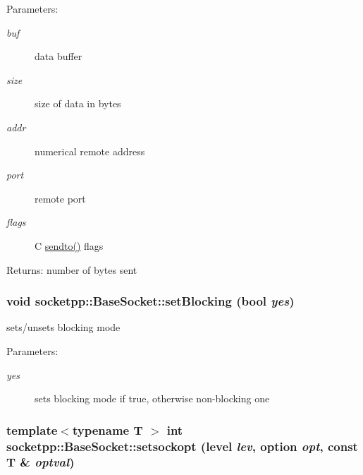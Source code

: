 \begin{CompactItemize}
\begin{Desc}
\item[Parameters:]
\begin{description}
\item[{\em buf}]data buffer \item[{\em size}]size of data in bytes \item[{\em addr}]numerical remote address \item[{\em port}]remote port \item[{\em flags}]C \hyperlink{classsocketpp_1_1BaseSocket_d6df36281c6fce81e5c4c493ac91a6f8}{sendto()} flags \end{description}
\end{Desc}
\begin{Desc}
\item[Returns:]number of bytes sent \end{Desc}
\hypertarget{classsocketpp_1_1BaseSocket_4cffcd5cae4ef51e953495837fade4c3}{
\subsubsection[{setBlocking}]{\setlength{\rightskip}{0pt plus 5cm}void socketpp::BaseSocket::setBlocking (bool {\em yes})}}
\label{classsocketpp_1_1BaseSocket_4cffcd5cae4ef51e953495837fade4c3}


sets/unsets blocking mode 

\begin{Desc}
\item[Parameters:]
\begin{description}
\item[{\em yes}]sets blocking mode if true, otherwise non-blocking one \end{description}
\end{Desc}
\hypertarget{classsocketpp_1_1BaseSocket_3f1f168e4953c046bb1159941da2fa30}{
\subsubsection[{setsockopt}]{\setlength{\rightskip}{0pt plus 5cm}template$<$typename T $>$ int socketpp::BaseSocket::setsockopt (level {\em lev}, \/  option {\em opt}, \/  const T \& {\em optval})}}
\label{classsocketpp_1_1BaseSocket_3f1f168e4953c046bb1159941da2fa30}



\end{CompactItemize}
